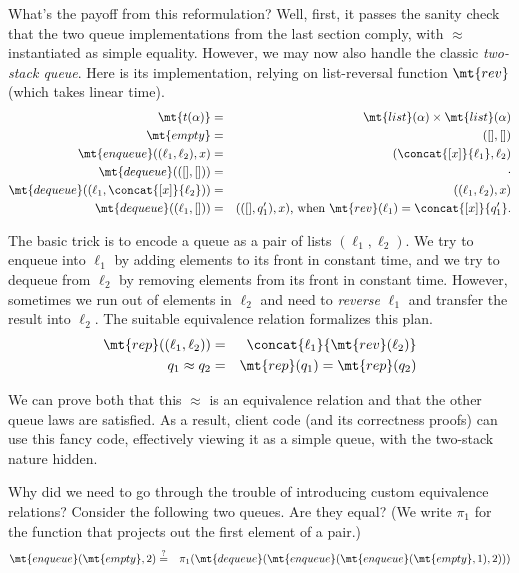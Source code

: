 \documentclass{amsbook}
\theoremstyle{definition}
\theoremstyle{remark}
\numberwithin{section}{chapter}
\numberwithin{equation}{chapter}
\begin{document}
What's the payoff from this reformulation?
Well, first, it passes the sanity check that the two queue implementations from the last section comply, with $\approx$ instantiated as simple equality.
However, we may now also handle the classic \emph{two-stack queue}.
Here is its implementation, relying on list-reversal function $\mt{rev}$ (which takes linear time).
\begin{eqnarray*}
  \mt{t(\alpha)} &=& \mt{list}(\alpha) \times \mt{list}(\alpha) \\
  \mt{empty} &=& ([], []) \\
  \mt{enqueue}((\ell_1, \ell_2), x) &=& (\concat{[x]}{\ell_1}, \ell_2) \\
  \mt{dequeue}(([], [])) &=& \cdot \\
  \mt{dequeue}((\ell_1, \concat{[x]}{\ell_2})) &=& ((\ell_1, \ell_2), x) \\
  \mt{dequeue}((\ell_1, [])) &=& (([], q'_1), x)\textrm{, when $\mt{rev}(\ell_1) = \concat{[x]}{q'_1}$.}
\end{eqnarray*}

The basic trick is to encode a queue as a pair of lists $(\ell_1, \ell_2)$.
We try to enqueue into $\ell_1$ by adding elements to its front in constant time, and we try to dequeue from $\ell_2$ by removing elements from its front in constant time.
However, sometimes we run out of elements in $\ell_2$ and need to \emph{reverse} $\ell_1$ and transfer the result into $\ell_2$.
The suitable equivalence relation formalizes this plan.
\begin{eqnarray*}
  \mt{rep}((\ell_1, \ell_2)) &=& \concat{\ell_1}{\mt{rev}(\ell_2)} \\
  q_1 \approx q_2 &=& \mt{rep}(q_1) = \mt{rep}(q_2)
\end{eqnarray*}

We can prove both that this $\approx$ is an equivalence relation and that the other queue laws are satisfied.
As a result, client code (and its correctness proofs) can use this fancy code, effectively viewing it as a simple queue, with the two-stack nature hidden.

Why did we need to go through the trouble of introducing custom equivalence relations?
Consider the following two queues.
Are they equal?
(We write $\pi_1$ for the function that projects out the first element of a pair.)
\begin{eqnarray*}
  \mt{enqueue}(\mt{empty}, 2) &\stackrel{?}{=}& \pi_1(\mt{dequeue}(\mt{enqueue}(\mt{enqueue}(\mt{empty}, 1), 2)))
\end{eqnarray*}
\end{document}
